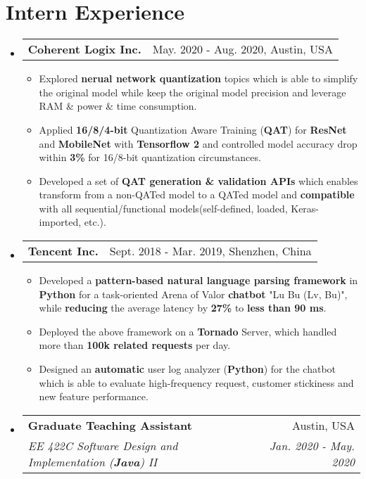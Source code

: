 \documentclass[letterpaper,11pt]{article}
\makeatletter
\newcommand{\resumeItem}[1]{
  \item\small{
    {#1}
  }
}
\newcommand{\resumeSubheading}[4]{
  \vspace{-1pt}\item
    \begin{tabular*}{0.97\textwidth}[t]{l@{\extracolsep{\fill}}r}
      \textbf{#1} & #2 \\
      \textit{\small#3} & \textit{\small #4} \\
    \end{tabular*}\vspace{-5pt}
}
\newcommand{\internSubheading}[2]{
	\vspace{-1pt}\item
	\begin{tabular*}{0.97\textwidth}[t]{l@{\extracolsep{\fill}}r}
		\textbf{#1} & #2 \\
	\end{tabular*}\vspace{-5pt}
}
\newcommand{\resumeSubHeadingListStart}{\begin{itemize}[leftmargin=*]}
\newcommand{\resumeSubHeadingListEnd}{\end{itemize}}
\newcommand{\resumeItemListStart}{\begin{itemize}}
\newcommand{\resumeItemListEnd}{\end{itemize}\vspace{-5pt}}
\makeatother
\begin{document}
\section{Intern Experience}
  \resumeSubHeadingListStart
  	\internSubheading
  	{Coherent Logix Inc.}{May. 2020 - Aug. 2020, Austin, USA}
  	\resumeItemListStart
  	\resumeItem
  	{Explored \textbf{nerual network quantization} topics which is able to simplify the original model while keep the original model precision and leverage RAM \& power \& time consumption.}
  	\resumeItem
  	{Applied \textbf{16/8/4-bit} Quantization Aware Training (\textbf{QAT}) for \textbf{ResNet} and \textbf{MobileNet} with \textbf{Tensorflow 2} and controlled model accuracy drop within \textbf{3\%} for 16/8-bit quantization circumstances.}
  	\resumeItem
  	{Developed a set of \textbf{QAT generation \& validation APIs} which enables transform from a non-QATed model to a QATed model and \textbf{compatible} with all sequential/functional models(self-defined, loaded, Keras-imported, etc.).}
  	\resumeItemListEnd
  	
    \internSubheading
      {Tencent Inc.}{Sept. 2018 - Mar. 2019, Shenzhen, China}
      \resumeItemListStart
      	\resumeItem
      	  {Developed a \textbf{pattern-based natural language parsing framework} in \textbf{Python} for a task-oriented Arena of Valor \textbf{chatbot} "Lu Bu (Lv, Bu)", while \textbf{reducing} the average latency by \textbf{27\%} to \textbf{less than 90 ms}.}
      	\resumeItem
          {Deployed the above framework on a \textbf{Tornado} Server, which handled more than \textbf{100k related requests} per day. }
        \resumeItem
          {Designed an \textbf{automatic} user log analyzer (\textbf{Python}) for the chatbot which is able to evaluate high-frequency request, customer stickiness and new feature performance.}
      \resumeItemListEnd
      \resumeSubheading
      {Graduate Teaching Assistant}{Austin, USA}
      {EE 422C Software Design and Implementation (\textbf{Java}) II }{Jan. 2020 - May. 2020}
      
      \resumeSubHeadingListEnd
      
\end{document}
